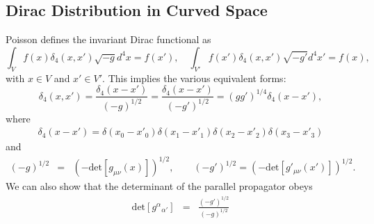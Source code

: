 \documentclass[10pt,letterpaper]{article}
\begin{document}
\subsection{Dirac Distribution in Curved Space}
Poisson defines the invariant Dirac functional as
\begin{equation}
\int_V f(x)\delta_4(x,x')\sqrt{-g}d^4x = f(x'),\quad \int_{V'} f(x')\delta_4(x,x')\sqrt{-g'}d^4x' = f(x),
\end{equation}
with $x\in V$ and $x' \in V'$. 
This implies the various equivalent forms:
\begin{equation}
\delta_4(x,x') = \frac{\delta_4(x-x')}{(-g)^{1/2}}=\frac{\delta_4(x-x')}{(-g')^{1/2}}
=(gg')^{1/4} \delta_4(x-x'),
\end{equation}
where 
\begin{eqnarray}
\delta_4(x-x') = \delta(x_0-x'_0)\delta(x_1-x'_1)\delta(x_2-x'_2)\delta(x_3-x'_3)
\end{eqnarray}
and
\begin{eqnarray}
(-g)^{1/2} &=& (-\text{det}[g_{\mu\nu}(x)])^{1/2},\qquad  (-g')^{1/2} = (-\text{det}[g'_{\mu\nu}(x')])^{1/2}.
\end{eqnarray}
We can also show that the determinant of the parallel propagator obeys
\begin{eqnarray}
\text{det}[g^{\alpha}{}_{\alpha'}] &=& \frac{ (-g')^{1/2}}{(-g)^{1/2}}
\end{eqnarray}

\end{document}
